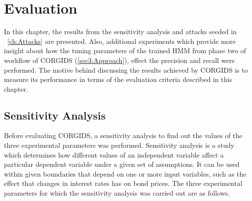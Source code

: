 
\chapter{\textbf{Evaluation}}
\label{sec6:Evaluation}
In this chapter, the results from the sensitivity analysis and attacks seeded in ~\autoref{ch:Attacks} are presented. Also, additional experiments which provide more insight about how the tuning parameters of the trained HMM from phase two of workflow of \ac{CORGIDS} (\autoref{sec3:Approach}), effect the precision and recall were performed. The motive behind discussing the results achieved by \ac{CORGIDS} is to measure its performance in terms of the evaluation criteria described in this chapter.

\section{Sensitivity Analysis}
\label{sensitivityAnalysis}

Before evaluating \ac{CORGIDS}, a sensitivity analysis to find out the values of the three experimental parameters was performed. Sensitivity analysis is a study which determines how different values of an independent variable affect a particular dependent variable under a given set of assumptions. It can be used within given boundaries that depend on one or more input variables, such as the effect that changes in interest rates has on bond prices. The three experimental parameters for which the sensitivity analysis was carried out are as follows.

